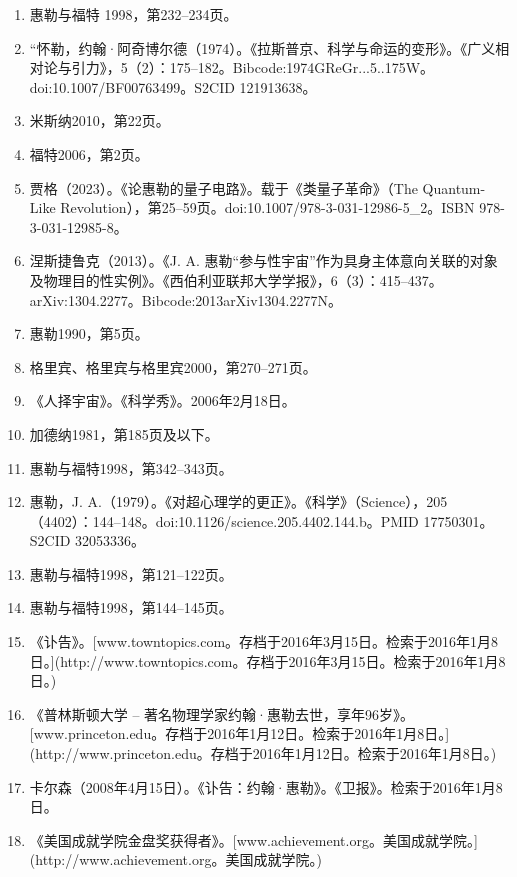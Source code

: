 \begin{enumerate}
\item 惠勒与福特 1998，第232–234页。
\item “怀勒，约翰·阿奇博尔德（1974）。《拉斯普京、科学与命运的变形》。《广义相对论与引力》，5（2）：175–182。Bibcode:1974GReGr...5..175W。doi:10.1007/BF00763499。S2CID 121913638。
\item 米斯纳2010，第22页。
\item 福特2006，第2页。
\item 贾格（2023）。《论惠勒的量子电路》。载于《类量子革命》（The Quantum-Like Revolution），第25–59页。doi:10.1007/978-3-031-12986-5\_2。ISBN 978-3-031-12985-8。
\item 涅斯捷鲁克（2013）。《J. A. 惠勒“参与性宇宙”作为具身主体意向关联的对象及物理目的性实例》。《西伯利亚联邦大学学报》，6（3）：415–437。arXiv:1304.2277。Bibcode:2013arXiv1304.2277N。
\item 惠勒1990，第5页。
\item 格里宾、格里宾与格里宾2000，第270–271页。
\item 《人择宇宙》。《科学秀》。2006年2月18日。
\item 加德纳1981，第185页及以下。
\item 惠勒与福特1998，第342–343页。
\item 惠勒，J. A.（1979）。《对超心理学的更正》。《科学》（Science），205（4402）：144–148。doi:10.1126/science.205.4402.144.b。PMID 17750301。S2CID 32053336。
\item 惠勒与福特1998，第121–122页。
\item 惠勒与福特1998，第144–145页。
\item 《讣告》。[www.towntopics.com。存档于2016年3月15日。检索于2016年1月8日。](http://www.towntopics.com。存档于2016年3月15日。检索于2016年1月8日。)
\item 《普林斯顿大学 – 著名物理学家约翰·惠勒去世，享年96岁》。[www.princeton.edu。存档于2016年1月12日。检索于2016年1月8日。](http://www.princeton.edu。存档于2016年1月12日。检索于2016年1月8日。)
\item 卡尔森（2008年4月15日）。《讣告：约翰·惠勒》。《卫报》。检索于2016年1月8日。
\item 《美国成就学院金盘奖获得者》。[www.achievement.org。美国成就学院。](http://www.achievement.org。美国成就学院。)
\end{enumerate}
